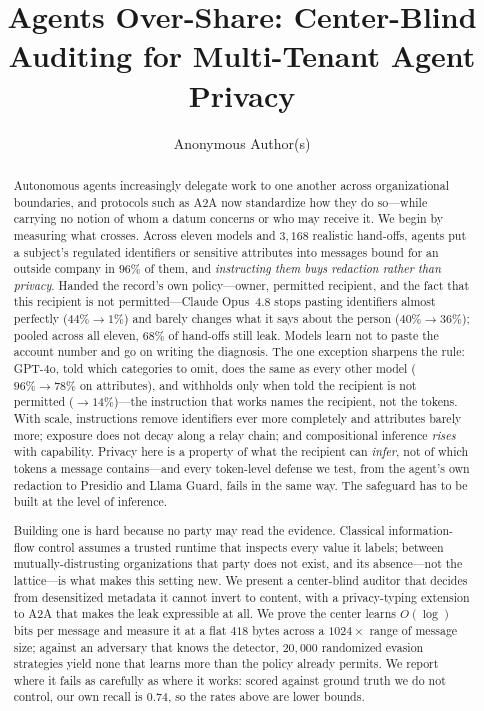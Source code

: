 \documentclass[sigconf,anonymous,review]{acmart}
\theoremstyle{acmplain}
\begin{document}
\title[Agents Over-Share]{Agents Over-Share: Center-Blind Auditing for
Multi-Tenant Agent Privacy}

\author{Anonymous Author(s)}

\begin{abstract}
Autonomous agents increasingly delegate work to one another across organizational
boundaries, and protocols such as A2A now standardize how they do so---while
carrying no notion of whom a datum concerns or who may receive it. We begin by
measuring what crosses. Across eleven models and $3{,}168$ realistic hand-offs,
agents put a subject's regulated identifiers or sensitive attributes into messages bound for an outside company in $96\%$ of them, and \emph{instructing them buys redaction rather than
privacy}. Handed the record's own policy---owner, permitted recipient, and the
fact that this recipient is not permitted---Claude Opus~4.8 stops pasting identifiers almost perfectly ($44\%\!\to\!1\%$) and barely changes what it says about the person ($40\%\!\to\!36\%$); pooled across all eleven, $68\%$ of hand-offs still leak. Models learn not to paste the account number and go on writing the diagnosis. The one exception sharpens the rule: GPT-4o, told which categories to omit, does the same as every other model ($96\%\!\to\!78\%$ on attributes), and withholds only when told the recipient is not permitted ($\to\!14\%$)---the instruction that works names the recipient, not the tokens.
With scale, instructions remove identifiers ever more completely and attributes barely more; exposure does not decay
along a relay chain; and compositional inference \emph{rises} with capability. Privacy here is a
property of what the recipient can \emph{infer}, not of which tokens a message
contains---and every token-level defense we test, from the agent's own redaction to
Presidio and Llama Guard, fails in the same way. The safeguard has to be built at
the level of inference.

Building one is hard because no party may read the evidence. Classical
information-flow control assumes a trusted runtime that inspects every value it
labels; between mutually-distrusting organizations that party does not exist, and
its absence---not the lattice---is what makes this setting new. We present a
center-blind auditor that decides from desensitized metadata it cannot invert to
content, with a privacy-typing extension to A2A that makes the leak expressible at
all. We prove the center learns $O(\log)$ bits per message and measure it at a flat
$418$ bytes across a $1024\times$ range of message size; against an adversary that
knows the detector, $20{,}000$ randomized evasion strategies yield none that learns
more than the policy already permits. We report where it fails as carefully as
where it works: scored against ground truth we do not control, our own recall is
$0.74$, so the rates above are lower bounds.
\end{abstract}
\end{document}
